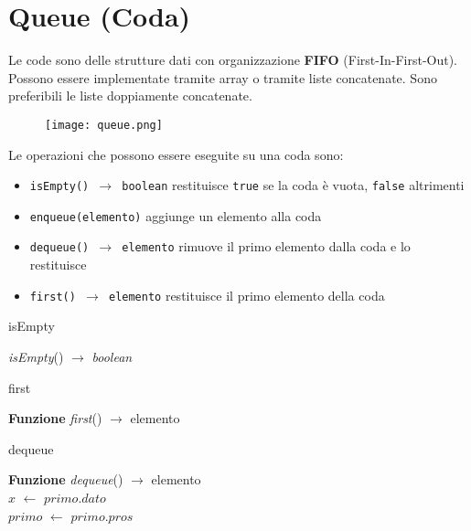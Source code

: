 \section{Queue (Coda)}
Le code sono delle strutture dati con organizzazione {\textbf{FIFO}}
(First-In-First-Out).
Possono essere implementate tramite array o tramite liste concatenate. Sono 
preferibili le liste doppiamente concatenate.\newline
\begin{wrapfigure}{r}{7cm}
    \texttt{[image: queue.png]}
\end{wrapfigure}

Le operazioni che possono essere eseguite su una coda sono:
\begin{itemize}
    \item {\texttt{isEmpty() $\rightarrow$ boolean}} restituisce \verb|true| se la coda è vuota, \verb|false| altrimenti
    \item {\texttt{enqueue(elemento)}} aggiunge un elemento alla coda
    \item {\texttt{dequeue() $\rightarrow$ elemento}} rimuove il primo elemento dalla coda e lo restituisce
    \item {\texttt{first() $\rightarrow$ elemento}} restituisce il primo elemento della coda
\end{itemize}

\begin{algorithm}
    \caption{isEmpty}
     {\emph{isEmpty}}() $\rightarrow$ {\emph{boolean}}\\
       \Indp{}
\end{algorithm}

\begin{algorithm}
    \caption{first}
    \Indm\textbf{Funzione} \emph{first}() $\rightarrow$ elemento\\
    \Indp{}
\end{algorithm}

\begin{algorithm}
    \caption{dequeue}
    \Indm\textbf{Funzione} \emph{dequeue}() $\rightarrow$ elemento\\
    \Indp$x$ $\leftarrow$ $primo.dato$\\
    $primo$ $\leftarrow$ $primo.pros$\\
\end{algorithm}

